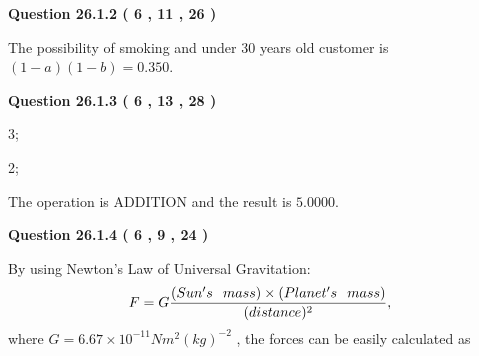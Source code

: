 \documentclass[12pt]{article}
\begin{document}
\vspace{0.2in}
  
{\textbf{\Large{Question
26.1.2 
 (           6 ,          11 ,          26 )
}}}
  
  
 
 
\noindent{}

The possibility of  %
smoking and  %
under 30 years old
customer is $ (1-a)(1-b) =  %
0.350 $.
 
 
  
\vspace{0.2in}
  
{\textbf{\Large{Question
26.1.3 
 (           6 ,          13 ,          28 )
}}}
  
  
 
 
\noindent{}

3;
 
2;
 
The operation is  %
ADDITION and the result is
$ %
5.0000$.
 
 
 
  
\vspace{0.2in}
  
{\textbf{\Large{Question
26.1.4 
 (           6 ,           9 ,          24 )
}}}
  
  
 
 
\noindent{}

By using Newton's Law of Universal Gravitation:
\[
F=G \frac{(Sun's \hspace{0.1in} mass) \times (Planet's \hspace{0.1in} mass)} { (distance)^2},
\]
where
$ G= %
6.67 \times 10^{-11} N m^{2}(kg)^{-2}$ , the forces can be easily calculated as
 
\vspace{0.2in}
 
\end{document}
